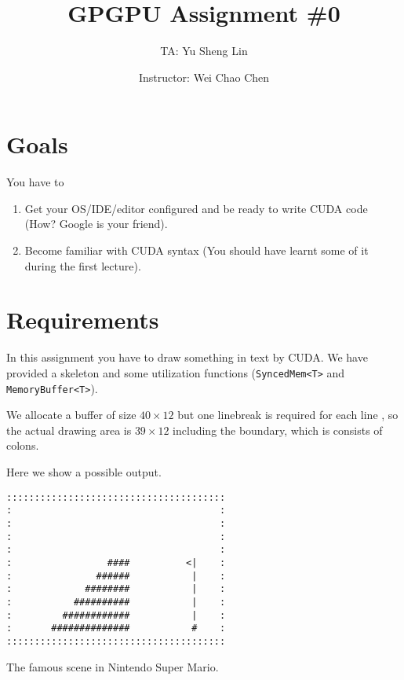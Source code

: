 \documentclass[12pt,a4paper]{article}
\begin{document}
\title{GPGPU Assignment \#0}
\author{TA: Yu Sheng Lin \and Instructor: Wei Chao Chen}
\maketitle

\section{Goals}

You have to

\begin{enumerate}
\item Get your OS/IDE/editor configured and be ready to write CUDA code (How? Google is your friend).
\item Become familiar with CUDA syntax (You should have learnt some of it during the first lecture).
\end{enumerate}

\section{Requirements}

In this assignment you have to draw something in text by CUDA.
We have provided a skeleton and some utilization functions (\verb+SyncedMem<T>+ and \verb+MemoryBuffer<T>+).

We allocate a buffer of size $40\times 12$ but one linebreak is required for each line
, so the actual drawing area is $39\times 12$ including the boundary, which is consists of colons.

Here we show a possible output.
\begin{listing}
\begin{verbatim}
:::::::::::::::::::::::::::::::::::::::
:                                     :
:                                     :
:                                     :
:                                     :
:                 ####          <|    :
:               ######           |    :
:             ########           |    :
:           ##########           |    :
:         ############           |    :
:       ##############           #    :
:::::::::::::::::::::::::::::::::::::::
\end{verbatim}
\caption{The famous scene in Nintendo Super Mario.}
\end{listing}
\end{document}
